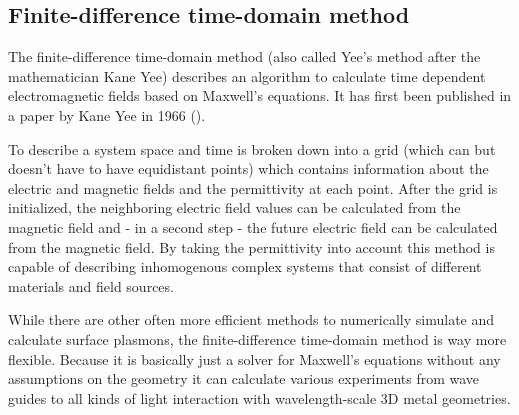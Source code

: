\subsection{Finite-difference time-domain method}

The finite-difference time-domain method (also called Yee's method after the mathematician Kane Yee) describes an algorithm to calculate time dependent electromagnetic fields based on Maxwell's equations. It has first been published in a paper by Kane Yee in 1966\cite{yee} ().

To describe a system space and time is broken down into a grid (which can but doesn't have to have equidistant points) which contains information about the electric and magnetic fields and the permittivity at each point. After the grid is initialized, the neighboring electric field values can be calculated from the magnetic field and - in a second step - the future electric field can be calculated from the magnetic field. By taking the permittivity into account this method is capable of describing inhomogenous complex systems that consist of different materials and field sources.

While there are other often more efficient methods to numerically simulate and calculate surface plasmons, the finite-difference time-domain method is way more flexible. Because it is basically just a solver for Maxwell's equations without any assumptions on the geometry it can calculate various experiments from wave guides to all kinds of light interaction with wavelength-scale 3D metal geometries\mcite.
